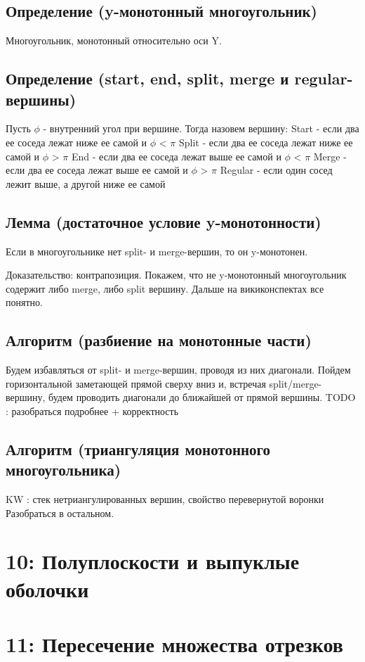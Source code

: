 \documentclass[11pt]{article}
\begin{document}
\subsection{Определение (y-монотонный многоугольник)}
\label{sec:orgheadline34}
Многоугольник, монотонный относительно оси Y.
\subsection{Определение (start, end, split, merge и regular-вершины)}
\label{sec:orgheadline35}
Пусть \(\phi\) - внутренний угол при вершине. Тогда назовем вершину:
Start - если два ее соседа лежат ниже ее самой и \(\phi\) < \(\pi\)
Split - если два ее соседа лежат ниже ее самой и \(\phi\) > \(\pi\)
End - если два ее соседа лежат выше ее самой и \(\phi\) < \(\pi\)
Merge - если два ее соседа лежат выше ее самой и \(\phi\) > \(\pi\)
Regular - если один сосед лежит выше, а другой ниже ее самой
\subsection{Лемма (достаточное условие y-монотонности)}
\label{sec:orgheadline36}
Если в многоугольнике нет split- и merge-вершин, то он y-монотонен.

Доказательство: контрапозиция. Покажем, что не y-монотонный многоугольник содержит либо merge, либо split вершину.
Дальше на викиконспектах все понятно.
\subsection{Алгоритм (разбиение на монотонные части)}
\label{sec:orgheadline37}
Будем избавляться от split- и merge-вершин, проводя из них диагонали.
Пойдем горизонтальной заметающей прямой сверху вниз и, встречая split/merge-вершину, будем проводить диагонали до ближайшей от прямой вершины.
TODO : разобраться подробнее + корректность
\subsection{Алгоритм (триангуляция монотонного многоугольника)}
\label{sec:orgheadline38}
KW : стек нетриангулированных вершин, свойство перевернутой воронки
Разобраться в остальном.
\section{{\bfseries{}} 10: Полуплоскости и выпуклые оболочки}
\label{sec:orgheadline40}
\section{{\bfseries{}} 11: Пересечение множества отрезков}
\label{sec:orgheadline41}
\end{document}
